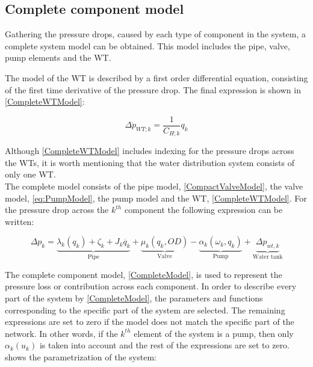 \subsection{Complete component model}
\label{CompleteSystemModel}
Gathering the pressure drops, caused by each type of component in the system, a complete system model can be obtained. This model includes the pipe, valve, pump elements and the WT. 

The model of the WT is described by a first order differential equation, consisting of the first time derivative of the pressure drop. The final expression is shown in \eqref{CompleteWTModel}:

\begin{equation}
  \label{CompleteWTModel}
  \Delta \dot{p}_{WT;k} = \frac{1}{C_{H;k}} q_k 
\end{equation}

Although \eqref{CompleteWTModel} includes indexing for the pressure drops across the WTs, it is worth mentioning that the water distribution system consists of only one WT.
\\
The complete model consists of the pipe model, \eqref{CompactValveModel}, the valve model, \eqref{eq:PumpModel}, the pump model and the WT, \eqref{CompleteWTModel}. For the pressure drop across the $k^{th}$ component the following expression can be written: 

%

\begin{equation}
\label{CompleteModel}
\Delta p_k = \underbrace{\lambda_k (q_k) + \zeta_k + J_k \dot{q_k}}_\text{Pipe} + \underbrace{\mu_k (q_k, OD)}_\text{Valve} - \underbrace{\alpha_k(\omega_k,q_k)}_\text{Pump} + \underbrace{\Delta p_{wt,k}}_\text{Water tank}
\end{equation}

The complete component model, \eqref{CompleteModel}, is used to represent the pressure loss or contribution across each component. In order to describe every part of the system by \eqref{CompleteModel}, the parameters and functions corresponding to the specific part of the system are selected. The remaining expressions are set to zero if the model does not match the specific part of the network. In other words, if the $k^{th}$ element of the system is a pump, then only $\alpha_k(u_k)$ is taken into account and the rest of the expressions are set to zero. 
 shows the parametrization of the system: 

